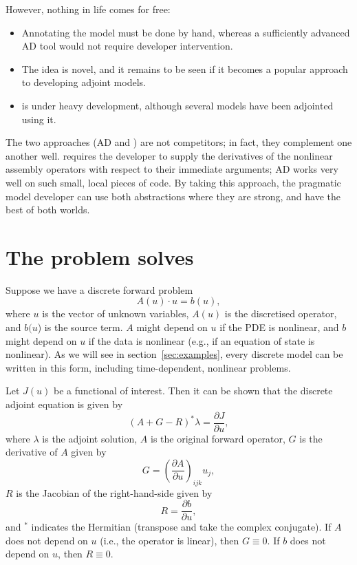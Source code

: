 However, nothing in life comes for free:
\begin{itemize}
\item Annotating the model must be done by hand, whereas a sufficiently advanced
AD tool would not require developer intervention.
\item The idea is novel, and it remains to be seen if it becomes a popular approach
to developing adjoint models.
\item \libadjoint is under heavy development, although several models have been adjointed
using it.
\end{itemize}

The two approaches (AD and \libadjoint) are not competitors; in fact, they complement one
another well. \libadjoint requires
the developer to supply the derivatives of the nonlinear assembly operators with respect to
their immediate arguments; AD works very well on such small, local pieces of code. By taking
this approach, the pragmatic model developer can use both abstractions where they are strong,
and have the best of both worlds.

\section{The problem \libadjoint solves}
Suppose we have a discrete forward problem
\begin{equation*}
A(u)\cdot u = b(u),
\end{equation*}
where $u$ is the vector of unknown variables, $A(u)$ is the discretised operator,
and $b(u$) is the source term. $A$ might depend on $u$ if the PDE is nonlinear,
and $b$ might depend on $u$ if the data is nonlinear (e.g., if an equation of
state is nonlinear).  As we will see in section~\ref{sec:examples}, every discrete model
can be written in this form, including time-dependent, nonlinear problems.

Let $J(u)$ be a functional of interest. Then it can be shown \citep{gunzburger2003} that
the discrete adjoint equation is given by
\begin{equation*}
(A + G - R)^* \lambda = \frac{\partial J}{\partial u},
\end{equation*}
where $\lambda$ is the adjoint solution, $A$ is the original forward operator, $G$ is the derivative of $A$ given by
\begin{equation*}
G = \left({\frac{\partial A}{\partial u}}\right)_{ijk} u_j,
\end{equation*}
$R$ is the Jacobian of the right-hand-side given by
\begin{equation*}
R = \frac{\partial b}{\partial u},
\end{equation*}
and $^*$ indicates the Hermitian (transpose and take the complex conjugate). If $A$ does not depend on
$u$ (i.e., the operator is linear), then $G \equiv 0$. If $b$ does not depend on
$u$, then $R \equiv 0$.

